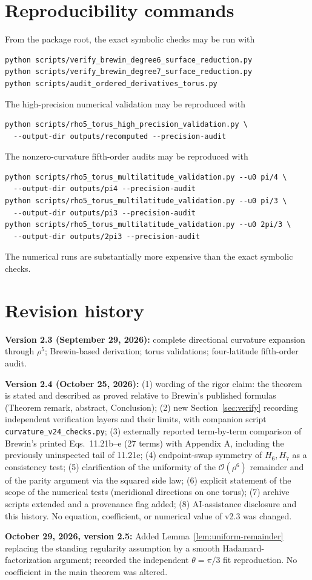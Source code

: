 \documentclass[11pt]{amsart}
\numberwithin{equation}{section}
\theoremstyle{remark}
\newcommand{\bigO}{\mathcal{O}}
\begin{document}
\section{Reproducibility commands}\label{app:commands}
From the package root, the exact symbolic checks may be run with
\begin{verbatim}
python scripts/verify_brewin_degree6_surface_reduction.py
python scripts/verify_brewin_degree7_surface_reduction.py
python scripts/audit_ordered_derivatives_torus.py
\end{verbatim}
The high-precision numerical validation may be reproduced with
\begin{verbatim}
python scripts/rho5_torus_high_precision_validation.py \
  --output-dir outputs/recomputed --precision-audit
\end{verbatim}
The nonzero-curvature fifth-order audits may be reproduced with
\begin{verbatim}
python scripts/rho5_torus_multilatitude_validation.py --u0 pi/4 \
  --output-dir outputs/pi4 --precision-audit
python scripts/rho5_torus_multilatitude_validation.py --u0 pi/3 \
  --output-dir outputs/pi3 --precision-audit
python scripts/rho5_torus_multilatitude_validation.py --u0 2pi/3 \
  --output-dir outputs/2pi3 --precision-audit
\end{verbatim}
The numerical runs are substantially more expensive than the exact symbolic checks.

\section{Revision history}\label{app:history}
\textbf{Version 2.3 (September 29, 2026):} complete directional curvature expansion through $\rho^5$; Brewin-based derivation; torus validations; four-latitude fifth-order audit.

\textbf{Version 2.4 (October 25, 2026):} (1) wording of the rigor claim: the theorem is stated and described as proved relative to Brewin's published formulas (Theorem remark, abstract, Conclusion); (2) new Section~\ref{sec:verify} recording independent verification layers and their limits, with companion script \texttt{curvature\_v24\_checks.py}; (3) externally reported term-by-term comparison of Brewin's printed Eqs.~11.21b--e (27 terms) with Appendix A, including the previously uninspected tail of 11.21e; (4) endpoint-swap symmetry of $H_6,H_7$ as a consistency test; (5) clarification of the uniformity of the $\bigO(\rho^6)$ remainder and of the parity argument via the squared side law; (6) explicit statement of the scope of the numerical tests (meridional directions on one torus); (7) archive scripts extended and a provenance flag added; (8) AI-assistance disclosure and this history. No equation, coefficient, or numerical value of v2.3 was changed.



\noindent\textbf{October 29, 2026, version 2.5:} Added Lemma~\ref{lem:uniform-remainder} replacing the standing regularity assumption by a smooth Hadamard-factorization argument; recorded the independent $\theta=\pi/3$ fit reproduction. No coefficient in the main theorem was altered.
\end{document}
